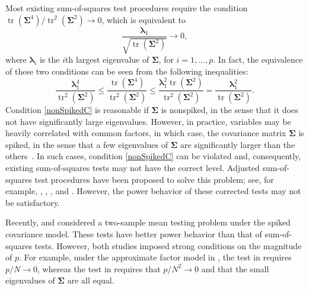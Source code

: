 \documentclass[12pt]{article} %
\DeclareMathOperator{\mytr}{tr}
\newcommand{\bfsym}[1]{\ensuremath{\boldsymbol{#1}}}
\def\blambda {\bfsym {\lambda}}
\def\bSigma {\bfsym {\Sigma}}
\theoremstyle{definition}
\begin{document}

Most existing sum-of-squares test procedures require the condition  $\mytr(\bSigma^4)/\mytr^2(\bSigma^2)\to 0$, which is equivalent to
\begin{equation}\label{nonSpikedC}
    \frac{\blambda_1}{\sqrt{\mytr(\bSigma^2)}}\to 0,
\end{equation}
where $\blambda_i$ is the $i$th largest eigenvalue of $\bSigma$, for $i=1,\ldots, p$.
In fact, the equivalence of these two conditions can be seen from the following inequalities:
\begin{equation*}
    \frac{\blambda_1^4}{\mytr^2(\bSigma^2)} 
    \leq
    \frac{\mytr(\bSigma^4)}{\mytr^2(\bSigma^2)}
    \leq
    \frac{\blambda_1^2 \mytr(\bSigma^2)}{\mytr^2(\bSigma^2)}
    =\frac{\blambda_1^2}{\mytr(\bSigma^2)}.
\end{equation*}
Condition \eqref{nonSpikedC} is reasonable if $\bSigma$ is nonspiked, in the sense that it does not have significantly large eigenvalues.
However, in practice, variables may be heavily correlated with common factors, in which case, the covariance matrix $\bSigma$ is spiked, in the sense that a few eigenvalues of $\bSigma$ are significantly larger than the others~\citep{Fan2013Large,Cai2015Optimal,wang2017As}.
In such cases, condition \eqref{nonSpikedC} can be violated and, consequently, existing sum-of-squares tests may not have the correct level.
Adjusted sum-of-squares test procedures have been proposed to solve this problem;
see, for example,
\cite{Katayama2013Asymptotic}, \cite{Ma2015A}, \cite{ZHANG2017200}, and \cite{WANG2018}.
However, the power behavior of these corrected tests may not be satisfactory.

Recently, \cite{Aoshima2018} and \cite{WANG2018225} considered a two-sample mean testing problem under the spiked covariance model.
These tests have better power behavior than that of sum-of-squares tests.
However, both studies imposed strong conditions on the magnitude of $p$.
For example, under the approximate factor model in \cite{Fan2013Large}, the test in \cite{Aoshima2018} requires $p/N \to 0$, whereas the test in \cite{WANG2018225} requires that $p/N^2\to 0$ and that the small eigenvalues of $\bSigma$ are all equal.
\end{document}
